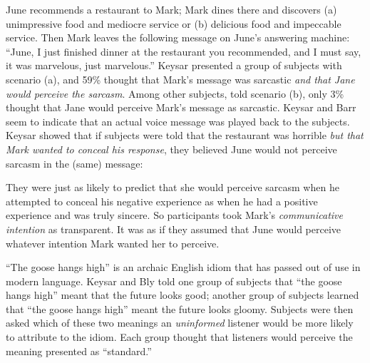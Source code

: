{
 June recommends a restaurant to Mark; Mark dines there and
discovers (a) unimpressive food and mediocre service or (b) delicious
food and impeccable service. Then Mark leaves the following message on
June's answering machine: ``June, I
just finished dinner at the restaurant you recommended, and I must say,
it was marvelous, just marvelous.'' Keysar presented
a group of subjects with scenario (a), and 59\% thought that
Mark's message was sarcastic \textit{and that Jane
would perceive the sarcasm}. Among other subjects,
told scenario (b), only 3\% thought that Jane would perceive
Mark's message as sarcastic. Keysar and Barr seem to
indicate that an actual voice message was played back to the
subjects. Keysar showed that if subjects were told
that the restaurant was horrible \textit{but that Mark wanted to
conceal his response}, they believed June would not perceive sarcasm in
the (same) message:}

{
 They were just as likely to predict that she would perceive
sarcasm when he attempted to conceal his negative experience as when he
had a positive experience and was truly sincere. So participants took
Mark's \textit{communicative intention} as transparent.
It was as if they assumed that June would perceive whatever intention
Mark wanted her to perceive.}

{
 ``The goose hangs high'' is an
archaic English idiom that has passed out of use in modern language.
Keysar and Bly told one group of subjects that ``the
goose hangs high'' meant that the future looks good;
another group of subjects learned that ``the goose
hangs high'' meant the future looks
gloomy. Subjects were then asked which of these two
meanings an \textit{uninformed} listener would be more likely to
attribute to the idiom. Each group thought that listeners would
perceive the meaning presented as
``standard.''}

